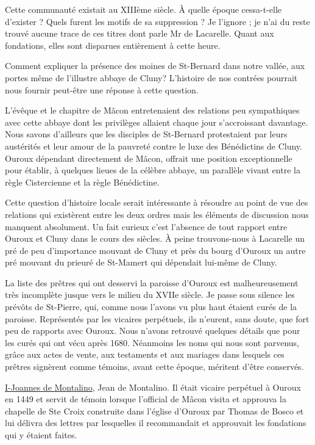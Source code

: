 Cette communauté existait au XIIIème siècle. À quelle époque cessa-t-elle d'exister ? Quels furent les motifs de sa suppression ? Je l'ignore ; je n'ai du reste trouvé aucune trace de ces titres dont parle Mr de Lacarelle. Quant aux fondations, elles sont disparues entièrement
à cette heure.

Comment expliquer la présence des moines de St-Bernard dans notre vallée, aux portes même de l'illustre abbaye de Cluny? L'histoire de nos contrées pourrait nous fournir peut-être une réponse à cette question.

L'évêque et le chapitre de Mâcon entretenaient des relations peu sympathiques avec cette abbaye dont les privilèges allaient chaque jour s'accroissant davantage. Nous savons d'ailleurs que les disciples de St-Bernard protestaient par leurs austérités et leur amour de la pauvreté contre le luxe des Bénédictins de Cluny. Ouroux dépendant directement de Mâcon, offrait une position exceptionnelle pour établir, à quelques lieues de la célèbre abbaye, un parallèle vivant entre la règle Cistercienne et la règle Bénédictine.

Cette question d'histoire locale serait intéressante à résoudre au point de vue des relations qui existèrent entre les deux ordres mais les éléments de discussion nous manquent absolument. Un fait curieux c'est l'absence de tout rapport entre Ouroux et Cluny dans le cours des siècles. À peine trouvons-nous à Lacarelle un pré de peu d'importance mouvant de Cluny et près du bourg d'Ouroux un autre pré mouvant du prieuré de St-Mamert qui dépendait lui-même de Cluny.

La liste des prêtres qui ont desservi la paroisse d'Ouroux est malheureusement très incomplète jusque vers le milieu du XVIIe siècle. Je passe sous silence les prévôts de St-Pierre, qui, comme nous l'avons vu plus haut étaient curés de la paroisse. Représentés par les vicaires perpétuels, ils n'eurent, sans doute, que fort peu de rapports avec Ouroux. Nous n'avons retrouvé quelques détails que pour les curés qui ont vécu après 1680. Néanmoins les noms qui nous sont parvenus, grâce aux actes de vente, aux testaments et aux mariages dans lesquels ces prêtres signèrent comme témoins, avant cette époque, méritent d'être conservés.

\underline{I-Joannes de Montalino}, Jean de Montalino.
Il était vicaire perpétuel à Ouroux en 1449 et servit de témoin lorsque l'official de Mâcon visita et approuva la chapelle de Ste Croix construite dans l'église d'Ouroux par Thomas de Bosco et lui délivra des lettres par lesquelles il recommandait et approuvait les fondations qui y étaient faites.

